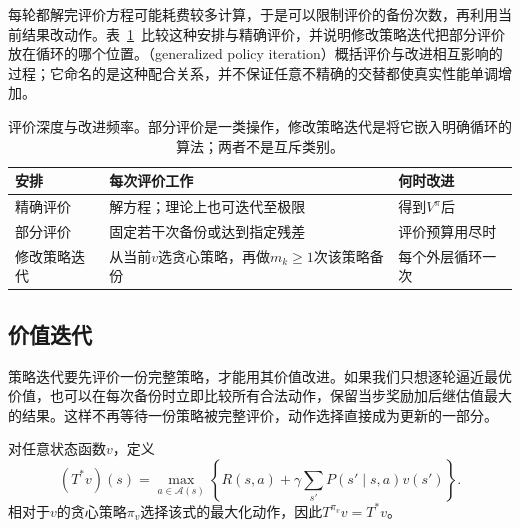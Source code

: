 每轮都解完评价方程可能耗费较多计算，于是可以限制评价的备份次数，再利用当前结果改动作。表~\ref{tab:rl-planning-evaluation-schedules}~比较这种安排与精确评价，并说明修改策略迭代把部分评价放在循环的哪个位置。（generalized policy iteration）概括评价与改进相互影响的过程；它命名的是这种配合关系，并不保证任意不精确的交替都使真实性能单调增加。

\begin{table}[htbp]
 \centering
 \small
 \begin{tabularx}{\linewidth}{@{}l>{\raggedright\arraybackslash}X>{\raggedright\arraybackslash}X@{}}
  \toprule
  安排 & 每次评价工作 & 何时改进\\
  \midrule
  精确评价 & 解方程；理论上也可迭代至极限 & 得到$V^\pi$后\\
  部分评价 & 固定若干次备份或达到指定残差 & 评价预算用尽时\\
  修改策略迭代 & 从当前$v$选贪心策略，再做$m_k\geq1$次该策略备份 & 每个外层循环一次\\
  \bottomrule
 \end{tabularx}
 \caption{评价深度与改进频率。部分评价是一类操作，修改策略迭代是将它嵌入明确循环的算法；两者不是互斥类别。}
 \label{tab:rl-planning-evaluation-schedules}
\end{table}

\subsection{价值迭代}
\label{sec:rl-planning-value-iteration}

策略迭代要先评价一份完整策略，才能用其价值改进。如果我们只想逐轮逼近最优价值，也可以在每次备份时立即比较所有合法动作，保留当步奖励加后继估值最大的结果。这样不再等待一份策略被完整评价，动作选择直接成为更新的一部分。

\begin{definition}[最优Bellman算子]
 \label{def:rl-planning-optimal-operator}
 对任意状态函数$v$，定义
 \begin{equation}
 (T^*v)(s)=\max_{a\in\mathcal A(s)}
 \left\{R(s,a)+\gamma\sum_{s'}P(s'\mid s,a)v(s')\right\}.
 \label{eq:rl-planning-optimal-operator}
 \end{equation}
 相对于$v$的贪心策略$\pi_v$选择该式的最大化动作，因此$T^{\pi_v}v=T^*v$。
\end{definition}

